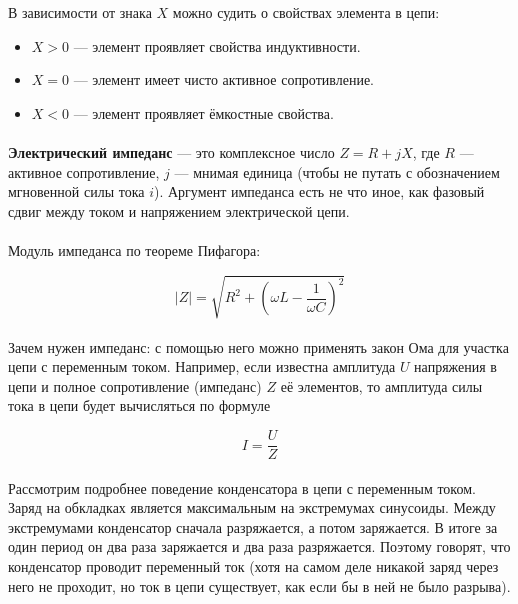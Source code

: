 \documentclass[dvipdfmx]{article}
\begin{document}
В зависимости от знака $X$ можно судить о свойствах элемента в цепи:

\begin{itemize}
\item
  $X > 0$ --- элемент проявляет свойства индуктивности.
\item
  $X = 0$ --- элемент имеет чисто активное сопротивление.
\item
  $X < 0$ --- элемент проявляет ёмкостные свойства.
\end{itemize}

\paragraph{}
\textbf{Электрический импеданс} --- это комплексное число $Z = R + jX$, где $R$ --- активное сопротивление, $j$ ---
мнимая единица (чтобы не путать с обозначением мгновенной силы тока $i$). Аргумент импеданса есть не что иное, как
фазовый сдвиг между током и напряжением электрической цепи.

\paragraph{}

Модуль импеданса по теореме Пифагора:

\begin{equation*}
  |Z| = \sqrt{R^2 + (\omega L - \frac{1}{\omega C})^2}
\end{equation*}

\paragraph{}

Зачем нужен импеданс: с помощью него можно применять закон Ома для участка цепи с переменным током. Например, если
известна амплитуда $U$ напряжения в цепи и полное сопротивление (импеданс) $Z$ её элементов, то амплитуда силы тока в
цепи будет вычисляться по формуле

\begin{equation*}
  I = \frac{U}{Z}
\end{equation*}

\paragraph{}

Рассмотрим подробнее поведение конденсатора в цепи с переменным током. Заряд на обкладках является
максимальным на экстремумах синусоиды. Между экстремумами конденсатор сначала разряжается, а потом заряжается.
В итоге за один период он два раза заряжается и два раза разряжается. Поэтому говорят, что конденсатор проводит
переменный ток (хотя на самом деле никакой заряд через него не проходит, но ток в цепи существует, как если бы в ней
не было разрыва).
\end{document}
